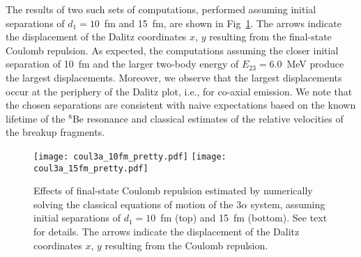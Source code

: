 The results of two such sets of computations, performed assuming initial separations of $d_{1}=10$~fm and 15~fm, are shown in Fig~\ref{fig:coulomb}. The arrows indicate the displacement of the Dalitz coordinates $x$, $y$ resulting from the final-state Coulomb repulsion. As expected, the computations assuming the closer initial separation of 10~fm and the larger two-body energy of $E_{23}=6.0$~MeV produce the largest displacements. Moreover, we observe that the largest displacements occur at the periphery of the Dalitz plot, i.e., for co-axial emission.  
We note that the chosen separations are consistent with naive expectations based on the known lifetime of the $^8$Be resonance and classical estimates of the relative velocities of the breakup fragments. 

\begin{figure}[htpb]
	\centering
	\texttt{[image: coul3a\_10fm\_pretty.pdf]}
	\texttt{[image: coul3a\_15fm\_pretty.pdf]}
	\caption{
		 Effects of final-state Coulomb repulsion estimated by numerically solving the classical equations of motion of the $3\alpha$ system, assuming initial separations of $d_{1}=10$~fm (top) and 15~fm (bottom). See text for details. The arrows indicate the displacement of the Dalitz coordinates $x$, $y$ resulting from the Coulomb repulsion.
	}
	\label{fig:coulomb}
\end{figure}
